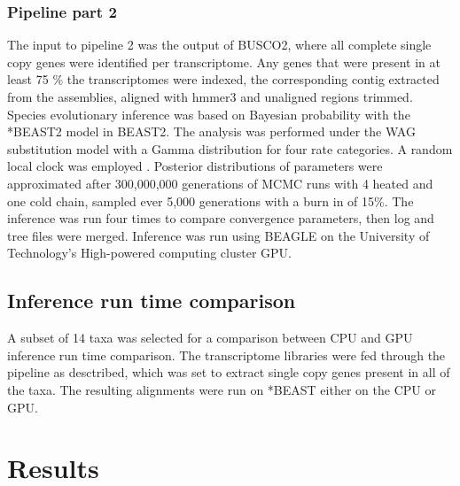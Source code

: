 \documentclass[12pt]{article}
\begin{document}
\subsubsection*{Pipeline part 2}
The input to pipeline 2 was the output of BUSCO2, where all complete single copy genes were identified per transcriptome. Any genes that were present in at least 75 \% the transcriptomes were indexed, the corresponding contig extracted from the assemblies, aligned with hmmer3 and unaligned regions trimmed. Species evolutionary inference was based on Bayesian probability with the *BEAST2 model in BEAST2. The analysis was performed under the WAG substitution model \cite{whelan2001general} with a Gamma distribution for four rate categories. A random local clock was employed \cite{drummond2010bayesian}. Posterior distributions of parameters were approximated after 300,000,000 generations of MCMC runs with 4 heated and one cold chain, sampled ever 5,000 generations  with a burn in of 15\%. The inference was run four times to compare convergence parameters, then log and tree files were merged. Inference was run using BEAGLE \cite{ayres2011beagle} on the University of Technology's High-powered computing cluster GPU.

\subsection*{Inference run time comparison}
A subset of 14 taxa was selected for a comparison between CPU and GPU inference run time comparison. The transcriptome libraries were fed through the pipeline as desctribed, which was set to extract single copy genes present in all of the taxa. The resulting alignments were run on *BEAST either on the CPU or GPU.

\newpage
\section{Results}
\end{document}
